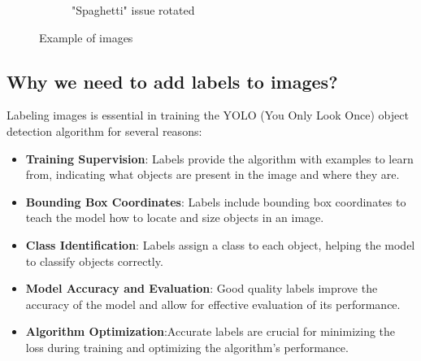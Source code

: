 \documentclass[12pt,a4paper]{article}
\begin{document}
\begin{figure}[h]
\begin{subfigure}[b]{0.45\textwidth}
        \caption{"Spaghetti" issue rotated\cite{onlineOpenSource1}}
        \label{fig:imageExampleRotated}
    \end{subfigure}
    \hfill

    \caption{Example of images}
    \label{fig:test}
\end{figure}



\subsection{Why we need to add labels to images?}

Labeling images is essential in training the YOLO (You Only Look Once) object detection algorithm for several reasons: 

\begin{itemize}
    \item \textbf{Training Supervision}: Labels provide the algorithm with examples to learn from, indicating what objects are present in the image and where they are.
    \item \textbf{Bounding Box Coordinates}: Labels include bounding box coordinates to teach the model how to locate and size objects in an image. 
    \item \textbf{Class Identification}: Labels assign a class to each object, helping the model to classify objects correctly.
    \item  \textbf{Model Accuracy and Evaluation}: Good quality labels improve the accuracy of the model and allow for effective evaluation of its performance.
    \item \textbf{Algorithm Optimization}:Accurate labels are crucial for minimizing the loss during training and optimizing the algorithm's performance.
\end{itemize}

\newpage
\end{document}
